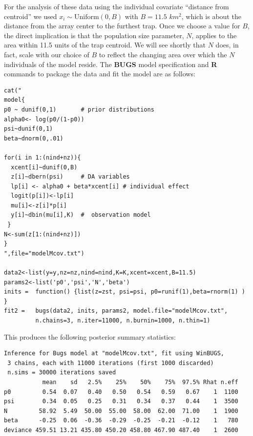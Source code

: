 For the analysis of these data using the individual covariate
``distance from centroid'' we used $x_{i} \sim \mbox{Uniform}(0,B)$
with $B = 11.5$ $km^2$, which is about the distance from the array
center to the furthest trap.  Once we choose a value for $B$, the direct
implication is that the population size parameter, $N$, applies to the area
within 11.5 units of the trap centroid. We will see shortly that $N$
does, in fact, scale with our choice of $B$ to reflect the changing
area over which the $N$ individuals of the model reside.  The {\bf
  BUGS} model specification and {\bf R} commands to package the data
and fit the model are as follows: 
{\small
\begin{verbatim}
cat("
model{
p0 ~ dunif(0,1)       # prior distributions
alpha0<- log(p0/(1-p0))
psi~dunif(0,1)
beta~dnorm(0,.01)

for(i in 1:(nind+nz)){
  xcent[i]~dunif(0,B)
  z[i]~dbern(psi)     # DA variables
  lp[i] <- alpha0 + beta*xcent[i] # individual effect
  logit(p[i])<-lp[i]
  mu[i]<-z[i]*p[i]
  y[i]~dbin(mu[i],K)  #  observation model
 }
N<-sum(z[1:(nind+nz)])
}
",file="modelMcov.txt")

data2<-list(y=y,nz=nz,nind=nind,K=K,xcent=xcent,B=11.5)
params2<-list('p0','psi','N','beta')
inits =  function() {list(z=zst, psi=psi, p0=runif(1),beta=rnorm(1) ) }
fit2 =   bugs(data2, inits, params2, model.file="modelMcov.txt",
         n.chains=3, n.iter=11000, n.burnin=1000, n.thin=1)
\end{verbatim}
}
This produces the following posterior summary statistics:
{\small
\begin{verbatim}
Inference for Bugs model at "modelMcov.txt", fit using WinBUGS,
 3 chains, each with 11000 iterations (first 1000 discarded)
 n.sims = 30000 iterations saved
           mean    sd   2.5%    25%    50%    75%  97.5% Rhat n.eff
p0         0.54  0.07   0.40   0.50   0.54   0.59   0.67    1  1100
psi        0.34  0.05   0.25   0.31   0.34   0.37   0.44    1  3500
N         58.92  5.49  50.00  55.00  58.00  62.00  71.00    1  1900
beta      -0.25  0.06  -0.36  -0.29  -0.25  -0.21  -0.12    1   780
deviance 459.51 13.21 435.80 450.20 458.80 467.90 487.40    1  2600
\end{verbatim}
}

